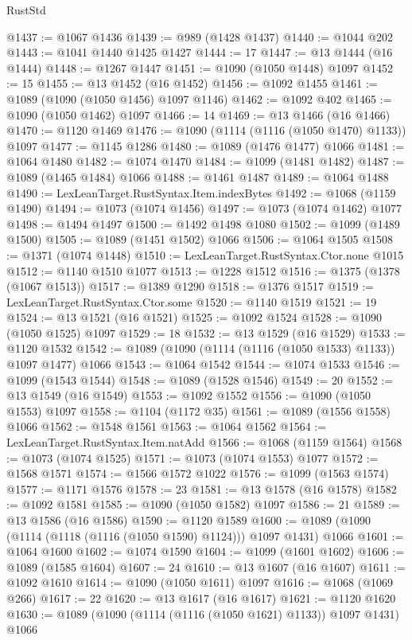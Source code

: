 \begin{lexlean}{RustStd}
\begin{coremodule}
@1437 := @1067 @1436
@1439 := @989 (@1428 @1437)
@1440 := @1044 @202
@1443 := @1041 @1440 @1425 @1427
@1444 := 17
@1447 := @13 @1444 (@16 @1444)
@1448 := @1267 @1447
@1451 := @1090 (@1050 @1448) @1097
@1452 := 15
@1455 := @13 @1452 (@16 @1452)
@1456 := @1092 @1455
@1461 := @1089 (@1090 (@1050 @1456) @1097 @1146)
@1462 := @1092 @402
@1465 := @1090 (@1050 @1462) @1097
@1466 := 14
@1469 := @13 @1466 (@16 @1466)
@1470 := @1120 @1469
@1476 := @1090 (@1114 (@1116 (@1050 @1470) @1133)) @1097
@1477 := @1145 @1286
@1480 := @1089 (@1476 @1477) @1066
@1481 := @1064 @1480
@1482 := @1074 @1470
@1484 := @1099 (@1481 @1482)
@1487 := @1089 (@1465 @1484) @1066
@1488 := @1461 @1487
@1489 := @1064 @1488
@1490 := LexLeanTarget.RustSyntax.Item.indexBytes
@1492 := @1068 (@1159 @1490)
@1494 := @1073 (@1074 @1456)
@1497 := @1073 (@1074 @1462) @1077
@1498 := @1494 @1497
@1500 := @1492 @1498 @1080
@1502 := @1099 (@1489 @1500)
@1505 := @1089 (@1451 @1502) @1066
@1506 := @1064 @1505
@1508 := @1371 (@1074 @1448)
@1510 := LexLeanTarget.RustSyntax.Ctor.none @1015
@1512 := @1140 @1510 @1077
@1513 := @1228 @1512
@1516 := @1375 (@1378 (@1067 @1513))
@1517 := @1389 @1290
@1518 := @1376 @1517
@1519 := LexLeanTarget.RustSyntax.Ctor.some
@1520 := @1140 @1519
@1521 := 19
@1524 := @13 @1521 (@16 @1521)
@1525 := @1092 @1524
@1528 := @1090 (@1050 @1525) @1097
@1529 := 18
@1532 := @13 @1529 (@16 @1529)
@1533 := @1120 @1532
@1542 := @1089 (@1090 (@1114 (@1116 (@1050 @1533) @1133)) @1097 @1477) @1066
@1543 := @1064 @1542
@1544 := @1074 @1533
@1546 := @1099 (@1543 @1544)
@1548 := @1089 (@1528 @1546)
@1549 := 20
@1552 := @13 @1549 (@16 @1549)
@1553 := @1092 @1552
@1556 := @1090 (@1050 @1553) @1097
@1558 := @1104 (@1172 @35)
@1561 := @1089 (@1556 @1558) @1066
@1562 := @1548 @1561
@1563 := @1064 @1562
@1564 := LexLeanTarget.RustSyntax.Item.natAdd
@1566 := @1068 (@1159 @1564)
@1568 := @1073 (@1074 @1525)
@1571 := @1073 (@1074 @1553) @1077
@1572 := @1568 @1571
@1574 := @1566 @1572 @1022
@1576 := @1099 (@1563 @1574)
@1577 := @1171 @1576
@1578 := 23
@1581 := @13 @1578 (@16 @1578)
@1582 := @1092 @1581
@1585 := @1090 (@1050 @1582) @1097
@1586 := 21
@1589 := @13 @1586 (@16 @1586)
@1590 := @1120 @1589
@1600 := @1089 (@1090 (@1114 (@1118 (@1116 (@1050 @1590) @1124))) @1097 @1431) @1066
@1601 := @1064 @1600
@1602 := @1074 @1590
@1604 := @1099 (@1601 @1602)
@1606 := @1089 (@1585 @1604)
@1607 := 24
@1610 := @13 @1607 (@16 @1607)
@1611 := @1092 @1610
@1614 := @1090 (@1050 @1611) @1097
@1616 := @1068 (@1069 @266)
@1617 := 22
@1620 := @13 @1617 (@16 @1617)
@1621 := @1120 @1620
@1630 := @1089 (@1090 (@1114 (@1116 (@1050 @1621) @1133)) @1097 @1431) @1066

\end{coremodule}
\end{lexlean}
